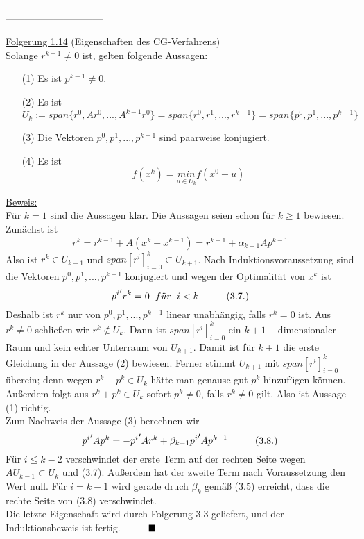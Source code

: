 \documentclass[a4paper]{letter}
\begin{document}
------------------------------------------------------------------------------------------------------------------------------------------



\underline{Folgerung 1.14} (Eigenschaften des CG-Verfahrens)
\\Solange $r^{k-1} \ne 0$ ist, gelten folgende Aussagen:
\begin{itemize}
\item[(1)] Es ist $p^{k-1} \ne 0$.
\item[(2)] Es ist
$$U_{k} := span\{r^{0}, Ar^{0},...,A^{k-1}r^{0}\} = span\{r^{0}, r^{1},...,r^{k-1}\} = span\{p^{0},p^{1},...,p^{k-1}\}$$
\item[(3)] Die Vektoren $p^{0},p^{1},...,p^{k-1}$ sind paarweise konjugiert.
\item[(4)] Es ist
$$f(x^{k}) = \underset{u \in U_{k}}{min} f(x^{0} + u)$$
\end{itemize}

\underline{Beweis:}
\\F\"ur $k = 1$ sind die Aussagen klar. Die Aussagen seien schon f\"ur $k \ge 1$ bewiesen.
\\Zun\"achst ist
$$r^{k} = r^{k-1} + A(x^{k} - x^{k-1}) = r^{k-1} + \alpha_{k-1}Ap^{k-1}$$
Also ist $r^{k} \in U_{k-1}$ und $span[r^{i}]_{i=0}^{k} \subset U_{k+1}$. Nach Induktionsvoraussetzung sind die Vektoren $p^{0},p^{1},...,p^{k-1}$ konjugiert und wegen der Optimalit\"at von $x^{k}$ ist
$${p^{i}}^\prime r^{k} = 0 \hspace{2mm} f\ddot{u}r \hspace{2mm} i < k \hspace{10mm} (3.7.)$$
Deshalb ist $r^{k}$ nur von $p^{0},p^{1},...,p^{k-1}$ linear unabh\"angig, falls $r^{k} = 0$ ist. Aus $r^{k} \ne 0$ schlie{\ss}en wir $r^{k} \notin U_{k}$. Dann ist $span[r^{i}]_{i=0}^{k}$ ein $k+1-$dimensionaler Raum und kein echter Unterraum von $U_{k+1}$. Damit ist für $k+1$ die erste Gleichung in der Aussage (2) bewiesen. Ferner stimmt $U_{k+1}$ mit $span[r^{i}]_{i=0}^{k}$ überein; denn wegen $r^{k} + p^{k} \in U_{k}$ h\"atte man genause gut $p^{k}$ hinzuf\"ugen k\"onnen.
\\Au{\ss}erdem folgt aus $r^{k} + p^{k} \in U_{k}$ sofort $p^{k} \ne 0$, falls $r^{k} \ne 0$ gilt. Also ist Aussage (1) richtig.
\\Zum Nachweis der Aussage (3) berechnen wir
$${p^{i}}^\prime Ap^{k} = -{p^{i}}^\prime Ar^{k} + \beta_{k-1} {p^{i}}^\prime Ap^{k-1}\hspace{10mm} (3.8.)$$
F\"ur $i \le k - 2$ verschwindet der erste Term auf der rechten Seite wegen $AU_{k-1} \subset U_{k}$ und (3.7). Au{\ss}erdem hat der zweite Term nach Voraussetzung den Wert null. F\"ur $i = k - 1$ wird gerade druch $\beta_{k}$ gem\"a{\ss} (3.5) erreicht, dass die rechte Seite von (3.8) verschwindet.
\\Die letzte Eigenschaft wird durch Folgerung 3.3 geliefert, und der Induktionsbeweis ist fertig.$\hspace{10mm} \blacksquare$
\end{document}
